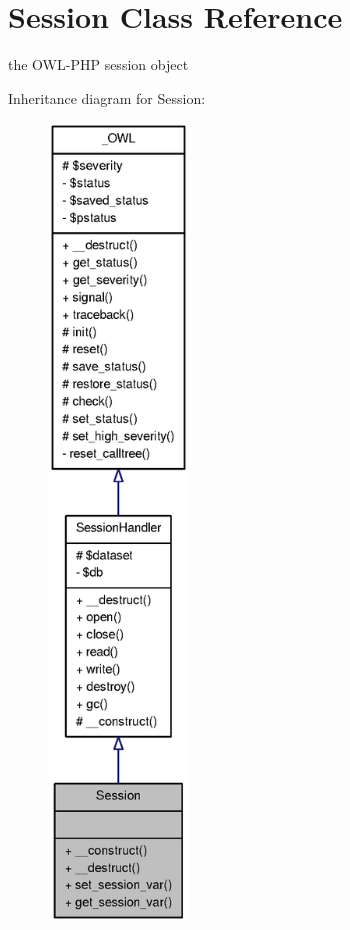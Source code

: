 \section{Session Class Reference}
\label{classSession}


the OWL-\/PHP session object  




Inheritance diagram for Session:\nopagebreak
\begin{figure}[H]
\begin{center}
\leavevmode
\includegraphics[height=600pt]{classSession__inherit__graph}
\end{center}
\end{figure}


